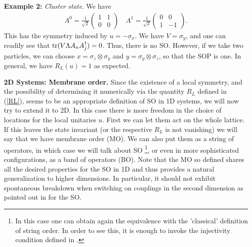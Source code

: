 \documentclass[prl,floatfix,showpacs,amsmat,twocolumn]{revtex4}
\newcommand{\be}{\begin{eqnarray}}
\newcommand{\ee}{\end{eqnarray}}
\newcommand{\1}{\mathbbm{1}}
\renewcommand{\>}{\rangle}
\newcommand{\<}{\langle}
\newcommand{\vs}{\vspace*{4pt}}
\begin{document}
{\bf Example 2:} {\em Cluster state}. We have \cite{MPS-mother}
\be
    A^0 = \frac{1}{\sqrt{2}} \left(\begin{array}{cc} 1 & 1 \\ 0 & 0 \end{array}\right)\quad
    A^1 = \frac{1}{\sqrt{2}}\left(\begin{array}{cc} 0 & 0 \\ 1 & -1 \end{array}\right).
\ee
This has the symmetry induced by $u=-\sigma_x$. We have
$V=\sigma_y$, and one can readily see that ${\rm tr}(V\Lambda A_n
    A_j^\dagger)= 0$. Thus, there is no SO. However, if we take two
particles, we can choose $x=\sigma_z\otimes\sigma_y$ and
$y=\sigma_y\otimes\sigma_z$, so that the SOP is one. In general,
we have $R_L(u)=1$ as expected. \vs

\textbf{2D Systems: Membrane order.}
Since the existence of a local symmetry, and the possibility of determining it numerically via the
quantity $R_L$ defined in (\ref{RL}), seems to be an appropriate definition of SO in 1D systems,
we will now try to extend it to 2D. In this case there is more freedom in the choice
of locations for the local unitaries $u$. First we can let them act on the whole lattice. If this leaves the state invariant (or the respective $R_L$ is not vanishing) we will say that
we have membrane order (MO). We can also put them as a string of
operators, in which case we will talk about SO \footnote{In this
    case one can obtain again the equivalence with the 'classical'
    definition of string order. In order to see this, it is enough to
    invoke the injectivity condition defined in \cite{PEPS-2}.}, or
even in more sophisticated configurations, as a band of operators
(BO). Note that the MO so defined shares all the desired
properties for the SO in 1D and thus provides a natural
generalization to higher dimensions. In particular, it should not
exhibit spontaneous breakdown when switching on couplings in the
second dimension as pointed out in \cite{fragility} for the SO.
\end{document}
